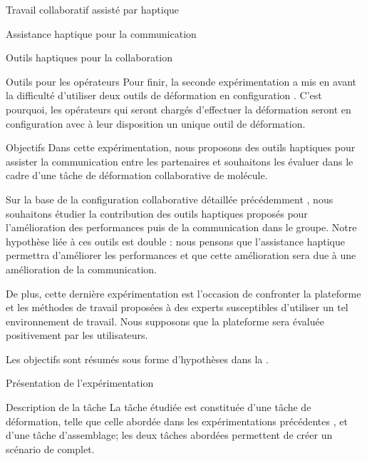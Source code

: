 \documentclass[myfrancais,ngerman,english,french]{mythesis}
\begin{document}
\begin{mychapter}{Travail collaboratif assisté par haptique}
\begin{mysection}{Assistance haptique pour la communication}
\begin{mysubsection}{Outils haptiques pour la collaboration}
\begin{mysubsubsection}{Outils pour les opérateurs}
					Pour finir, la seconde expérimentation a mis en avant la difficulté d'utiliser deux outils de déformation en configuration .
					C'est pourquoi, les opérateurs qui seront chargés d'effectuer la déformation seront en configuration  avec à leur disposition un unique outil de déformation.
				\end{mysubsubsection}
			\end{mysubsection}
			\begin{mysubsection}{Objectifs}
				Dans cette expérimentation, nous proposons des outils haptiques pour assister la communication entre les partenaires et souhaitons les évaluer dans le cadre d'une tâche de déformation collaborative de molécule.

				Sur la base de la configuration collaborative détaillée précédemment , nous souhaitons étudier la contribution des outils haptiques proposés pour l'amélioration des performances puis de la communication dans le groupe.
				Notre hypothèse liée à ces outils est double : nous pensons que l'assistance haptique permettra d'améliorer les performances et que cette amélioration sera due à une amélioration de la communication.

				De plus, cette dernière expérimentation est l'occasion de confronter la plateforme et les méthodes de travail proposées à des experts susceptibles d'utiliser un tel environnement de travail.
				Nous supposons que la plateforme sera évaluée positivement par les utilisateurs.

				Les objectifs sont résumés sous forme d'hypothèses dans la .
			\end{mysubsection}
		\end{mysection}
		\begin{mysection}{Présentation de l'expérimentation}
			\begin{mysubsection}{Description de la tâche}
				La tâche étudiée est constituée d'une tâche de déformation, telle que celle abordée dans les expérimentations précédentes , et d'une tâche d'assemblage; les deux tâches abordées permettent de créer un scénario de  complet.


\end{mysubsection}
\end{mysection}
\end{mychapter}
\end{document}
